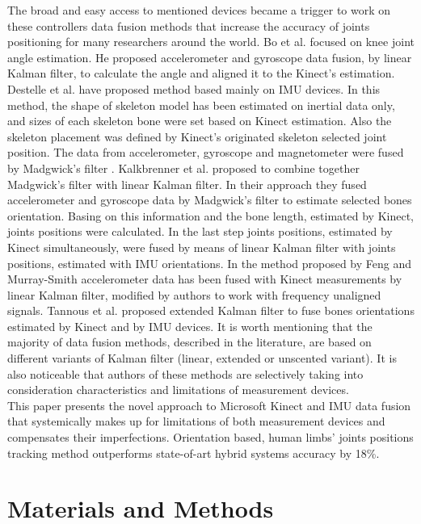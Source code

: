 \documentclass[sensors,article,submit,moreauthors,pdftex,10pt,a4paper]{mdpi}
\begin{document}
The broad and easy access to mentioned devices became a trigger to work on these controllers data fusion methods that increase the accuracy of joints positioning for many researchers around the world. Bo et al. \cite{Bo2011a} focused on knee joint angle estimation. He proposed accelerometer and gyroscope data fusion, by linear Kalman filter, to calculate the angle and aligned it to the Kinect’s estimation. Destelle et al. \cite{Destelle2014} have proposed method based mainly on IMU devices. In this method, the shape of skeleton model has been estimated on inertial data only, and sizes of each skeleton bone were set based on Kinect estimation. Also the skeleton placement was defined by Kinect's originated skeleton selected joint position. The data from accelerometer, gyroscope and magnetometer were fused by Madgwick’s filter \cite{Madgwick2011}. Kalkbrenner et al. \cite{Kalkbrenner2014} proposed to combine together Madgwick’s filter with linear Kalman filter. In their approach they fused accelerometer and gyroscope data by Madgwick’s filter to estimate selected bones orientation. Basing on this information and the bone length, estimated by Kinect, joints positions were calculated. In the last step joints positions, estimated by Kinect simultaneously, were fused by means of linear Kalman filter with joints positions, estimated with IMU orientations. In the method proposed by Feng and Murray-Smith \cite{Murray-Smith2014} accelerometer data has been fused with Kinect measurements by linear Kalman filter, modified by authors to work with frequency unaligned signals. Tannous et al. \cite{Tannous2016} proposed extended Kalman filter to fuse bones orientations estimated by Kinect and by IMU devices. It is worth mentioning that the majority of data fusion methods, described in the literature, are based on different variants of Kalman filter (linear, extended or unscented variant). It is also noticeable that authors of these methods are selectively taking into consideration characteristics and limitations of measurement devices. \\
This paper presents the novel approach to Microsoft Kinect and IMU data fusion that systemically makes up for limitations of both measurement devices and compensates their imperfections. Orientation based, human limbs’ joints positions tracking method outperforms state-of-art hybrid systems accuracy by 18\%.

\section{Materials and Methods}
\end{document}
